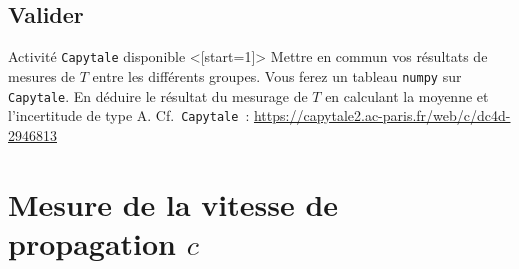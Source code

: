 \documentclass[../main/main.tex]{subfiles}
\begin{document}
\setcounter{subsection}{1}
\subsection{Valider}
Activité \texttt{Capytale} disponible
\QR<[start=1]>{%
	Mettre en commun vos résultats de mesures de $T$ entre les différents
	groupes. Vous ferez un tableau \texttt{numpy} sur \texttt{Capytale}.
	\smallbreak
	En déduire le résultat du mesurage de $T$ en calculant la moyenne et
	l'incertitude de type A.
}{%
	Cf.\ \texttt{Capytale}~: \url{https://capytale2.ac-paris.fr/web/c/dc4d-2946813}
}


\section{Mesure de la vitesse de propagation $c$}
\end{document}
